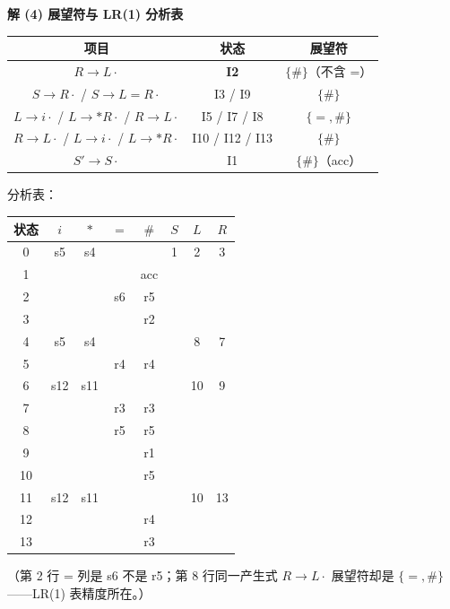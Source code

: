 \documentclass[12pt,a4paper,fontset=windows]{ctexart}
\begin{document}
\textbf{解 (4) 展望符与 LR(1) 分析表}

\begin{center}
\renewcommand{\arraystretch}{1.25}
\begin{tabular}{c c c}
\toprule
\textbf{项目} & \textbf{状态} & \textbf{展望符} \\
\midrule
$R \to L\cdot$ & \textbf{I2} & $\{\#\}$（不含 =） \\
$S \to R\cdot$ / $S \to L=R\cdot$ & I3 / I9 & $\{\#\}$ \\
$L \to i\cdot$ / $L \to *R\cdot$ / $R \to L\cdot$ & I5 / I7 / I8 & $\{=,\#\}$ \\
$R \to L\cdot$ / $L \to i\cdot$ / $L \to *R\cdot$ & I10 / I12 / I13 & $\{\#\}$ \\
$S' \to S\cdot$ & I1 & $\{\#\}$（acc） \\
\bottomrule
\end{tabular}
\end{center}

分析表：

\begin{center}
\renewcommand{\arraystretch}{1.3}
\begin{tabular}{c|ccccccc}
\toprule
状态 & $i$ & $*$ & $=$ & $\#$ & $S$ & $L$ & $R$ \\
\midrule
0 & s5 & s4 &  &  & 1 & 2 & 3 \\
1 &  &  &  & acc &  &  &  \\
2 &  &  & s6 & r5 &  &  &  \\
3 &  &  &  & r2 &  &  &  \\
4 & s5 & s4 &  &  &  & 8 & 7 \\
5 &  &  & r4 & r4 &  &  &  \\
6 & s12 & s11 &  &  &  & 10 & 9 \\
7 &  &  & r3 & r3 &  &  &  \\
8 &  &  & r5 & r5 &  &  &  \\
9 &  &  &  & r1 &  &  &  \\
10 &  &  &  & r5 &  &  &  \\
11 & s12 & s11 &  &  &  & 10 & 13 \\
12 &  &  &  & r4 &  &  &  \\
13 &  &  &  & r3 &  &  &  \\
\bottomrule
\end{tabular}
\end{center}

（第 2 行 = 列是 s6 不是 r5；第 8 行同一产生式 $R \to L\cdot$ 展望符却是 $\{=,\#\}$——LR(1) 表精度所在。）
\end{document}
